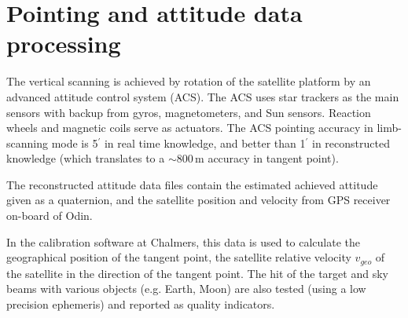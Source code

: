\section{Pointing and attitude data processing}

The vertical scanning is achieved by rotation of the satellite
platform by an advanced attitude control system (ACS). 
The ACS uses star trackers as the main sensors with backup from gyros, 
magnetometers, and Sun sensors. Reaction wheels and magnetic coils serve as 
actuators. The ACS pointing accuracy in limb-scanning mode is 5\(^{'}\) in
real time knowledge, and better than 1\(^{'}\) in reconstructed knowledge
(which translates to a \(\sim\)800\,m accuracy in tangent point).

The reconstructed attitude data files contain the estimated
achieved attitude given as a quaternion, and the satellite position   
and velocity from GPS receiver on-board of Odin.

In the calibration software at Chalmers, this data is used to calculate
the geographical position of the tangent point, the satellite relative velocity 
\(v_{geo}\) of the satellite in the direction of the tangent point.
The hit of the target and sky beams with various objects (e.g. Earth, Moon) 
are also tested (using a low precision ephemeris)
and reported as quality indicators.


